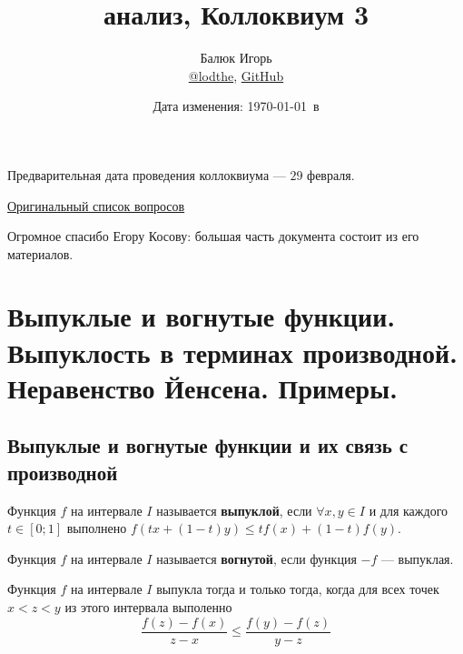 \documentclass[a4paper]{article}
\title{\HugeМатематический анализ, Коллоквиум 3}
\author{
	Балюк Игорь \\
	\href{https://teleg.run/lodthe}{@lodthe},
    \href{https://github.com/LoDThe/hse-tex}{GitHub} \\
}
\date{Дата изменения: \today \ в \currenttime}
\theoremstyle{named}
\begin{document}
    \maketitle

    \tableofcontents

    \newpage

    Предварительная дата проведения коллоквиума --- $29$ февраля.

    \href{https://www.dropbox.com/s/3sdxlo11hnmmaxw/%D0%9F%D1%80%D0%BE%D0%B3%D1%80%D0%B0%D0%BC%D0%BC%D0%B0%20%D0%BA%D0%BE%D0%BB%D0%BB%D0%BE%D0%BA%D0%B2%D0%B8%D1%83%D0%BC%D0%B0%20%D0%9C%D0%90-2-1.pdf?dl=0}{Оригинальный список вопросов}

    Огромное спасибо Егору Косову: большая часть документа состоит из его материалов.

    \section{Выпуклые и вогнутые функции. Выпуклость в терминах производной. Неравенство Йенсена. Примеры.}

        \subsection{Выпуклые и вогнутые функции и их связь с производной}

        \begin{definition*}
            Функция $f$ на интервале $I$ называется \textbf{выпуклой}, если $\forall x, y \in I$ и для каждого $t \in [0; 1]$ выполнено $f(tx + (1 - t)y) \leq tf(x) + (1 - t)f(y)$.

            Функция $f$ на интервале $I$ называется \textbf{вогнутой}, если функция $-f$ --- выпуклая.
        \end{definition*}

        \begin{lemma*}
            Функция $f$ на интервале $I$ выпукла тогда и только тогда, когда для всех точек $x < z < y$ из этого интервала выполенно
            \begin{equation*}
                \dfrac{f(z) - f(x)}{z - x} \leq \dfrac{f(y) - f(z)}{y - z}
            \end{equation*}
        \end{lemma*}
\end{document}
